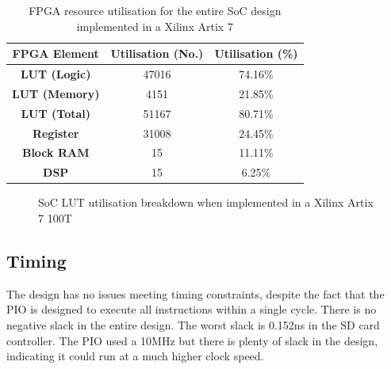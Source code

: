 \begin{table}[H]
    \centering
    \begin{tabular}{|c|c|c|}
        \hline
        \textbf{FPGA Element} & \textbf{Utilisation (No.)} & \textbf{Utilisation  (\%)} \\
        \hline
        \textbf{LUT (Logic)}  & 47016                      & 74.16\%                    \\
        \hline
        \textbf{LUT (Memory)} & 4151                       & 21.85\%                    \\
        \hline
        \textbf{LUT (Total)}  & 51167                      & 80.71\%                    \\
        \hline
        \textbf{Register}     & 31008                      & 24.45\%                    \\
        \hline
        \textbf{Block RAM}    & 15                         & 11.11\%                    \\
        \hline
        \textbf{DSP}          & 15                         & 6.25\%                     \\
        \hline
    \end{tabular}
    \caption{FPGA resource utilisation for the entire SoC design implemented in a Xilinx Artix 7}
    \label{tab:soc-util}
\end{table}

\begin{figure}[H]
    \centering
    \caption{SoC LUT utilisation breakdown when implemented in a Xilinx Artix 7 100T}
    \label{fig:pie}
\end{figure}

\subsection{Timing}

The design has no issues meeting timing constraints, despite the fact that the PIO is designed to execute all instructions within a single cycle. There is no negative slack in the entire design. The worst slack is 0.152ns in the SD card controller. The PIO used a 10MHz but there is plenty of slack in the design, indicating it could run at a much higher clock speed.

